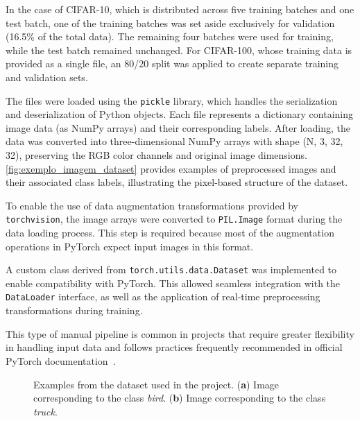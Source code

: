 \documentclass[journal,article,submit,pdftex,moreauthors]{Definitions/mdpi}
\begin{document}
In the case of CIFAR-10, which is distributed across five training batches and one test batch, one of the training batches was set aside exclusively for validation (16.5\% of the total data). The remaining four batches were used for training, while the test batch remained unchanged. For CIFAR-100, whose training data is provided as a single file, an 80/20 split was applied to create separate training and validation sets.

The files were loaded using the \texttt{pickle} library, which handles the serialization and deserialization of Python objects. Each file represents a dictionary containing image data (as NumPy arrays) and their corresponding labels. After loading, the data was converted into three-dimensional NumPy arrays with shape (N, 3, 32, 32), preserving the RGB color channels and original image dimensions. \autoref{fig:exemplo_imagem_dataset} provides examples of preprocessed images and their associated class labels, illustrating the pixel-based structure of the dataset.

To enable the use of data augmentation transformations provided by \texttt{torchvision}, the image arrays were converted to \texttt{PIL.Image} format during the data loading process. This step is required because most of the augmentation operations in PyTorch expect input images in this format.

A custom class derived from \texttt{torch.utils.data.Dataset} was implemented to enable compatibility with PyTorch. This allowed seamless integration with the \texttt{DataLoader} interface, as well as the application of real-time preprocessing transformations during training.

This type of manual pipeline is common in projects that require greater flexibility in handling input data and follows practices frequently recommended in official PyTorch documentation~\cite{pytorchdocs}.

\begin{figure}[H]
\centering
{}%
\hspace{0.2cm}
%
\caption{Examples from the dataset used in the project. (\textbf{a}) Image corresponding to the class \textit{bird}. (\textbf{b}) Image corresponding to the class \textit{truck}.\label{fig:exemplo_imagem_dataset}}
\end{figure}
\end{document}
